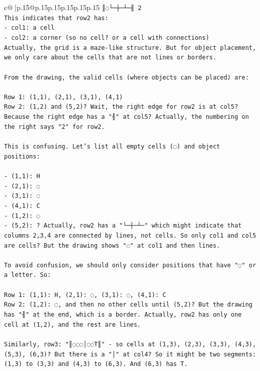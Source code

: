 \documentclass{article}
\begin{document}
{\begin{supertabular}{c@{$\;$}|p{.15\linewidth}@{}p{.15\linewidth}p{.15\linewidth}p{.15\linewidth}p{.15\linewidth}p{.15\linewidth}}
{{{\texttt{║◌└─┼─┴─╢ 2} \\
\texttt{This indicates that row2 has:} \\
\texttt{{-} col1: a cell} \\
\texttt{{-} col2: a corner (so no cell? or a cell with connections)} \\
\texttt{Actually, the grid is a maze{-}like structure. But for object placement, we only care about the cells that are not lines or borders.} \\
\\ 
\texttt{From the drawing, the valid cells (where objects can be placed) are:} \\
\\ 
\texttt{Row 1: (1,1), (2,1), (3,1), (4,1)} \\
\texttt{Row 2: (1,2) and (5,2)? Wait, the right edge for row2 is at col5? Because the right edge has a "╢" at col5? Actually, the numbering on the right says "2" for row2.} \\
\\ 
\texttt{This is confusing. Let's list all empty cells (◌) and object positions:} \\
\\ 
\texttt{{-} (1,1): H} \\
\texttt{{-} (2,1): ◌} \\
\texttt{{-} (3,1): ◌} \\
\texttt{{-} (4,1): C} \\
\texttt{{-} (1,2): ◌} \\
\texttt{{-} (5,2): ? Actually, row2 has a "└─┼─┴─" which might indicate that columns 2,3,4 are connected by lines, not cells. So only col1 and col5 are cells? But the drawing shows "◌" at col1 and then lines.} \\
\\ 
\texttt{To avoid confusion, we should only consider positions that have "◌" or a letter. So:} \\
\\ 
\texttt{Row 1: (1,1): H, (2,1): ◌, (3,1): ◌, (4,1): C} \\
\texttt{Row 2: (1,2): ◌, and then no other cells until (5,2)? But the drawing has "╢" at the end, which is a border. Actually, row2 has only one cell at (1,2), and the rest are lines.} \\
\\ 
\texttt{Similarly, row3: "║◌◌◌│◌◌T║" {-} so cells at (1,3), (2,3), (3,3), (4,3), (5,3), (6,3)? But there is a "│" at col4? So it might be two segments: (1,3) to (3,3) and (4,3) to (6,3). And (6,3) has T.} \\
}}}
\end{supertabular}}
\end{document}
